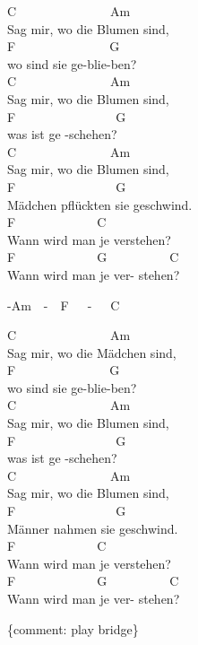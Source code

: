 \documentclass[
  letterpaper,
  twoside=false]{scrbook}
\begin{document}
C~~~~~~~~~~~~~~~Am~~~~~~~~~~~\\
Sag mir, wo die Blumen sind,\\
F~~~~~~~~~~~~~~~G\\
wo sind sie ge-blie-ben?\\
C~~~~~~~~~~~~~~~Am~~~~~~~~~~~\\
Sag mir, wo die Blumen sind,\\
F~~~~~~~~~~~~~~~~G\\
was ist ge -schehen?\\
C~~~~~~~~~~~~~~~Am~~~~~~~~~~~\\
Sag mir, wo die Blumen sind,\\
F~~~~~~~~~~~~~~~~G\\
Mädchen pflückten sie geschwind.\\
F~~~~~~~~~~~~~C~~~~~~~~~~~~~~~~~\\
Wann wird man je verstehen?~~~~~\\
F~~~~~~~~~~~~~G~~~~~~~~~~C\\
Wann wird man je ver- stehen?

-Am~~-~~F~~~-~~~C

C~~~~~~~~~~~~~~~Am~~~~~~~~~~~\\
Sag mir, wo die Mädchen sind,\\
F~~~~~~~~~~~~~~~G\\
wo sind sie ge-blie-ben?\\
C~~~~~~~~~~~~~~~Am~~~~~~~~~~~\\
Sag mir, wo die Blumen sind,\\
F~~~~~~~~~~~~~~~~G\\
was ist ge -schehen?\\
C~~~~~~~~~~~~~~~Am~~~~~~~~~~~\\
Sag mir, wo die Blumen sind,\\
F~~~~~~~~~~~~~~~~G\\
Männer nahmen sie geschwind.\\
F~~~~~~~~~~~~~C~~~~~~~~~~~~~~~~~\\
Wann wird man je verstehen?~~~~~\\
F~~~~~~~~~~~~~G~~~~~~~~~~C\\
Wann wird man je ver- stehen?

\{comment: play bridge\}
\end{document}
